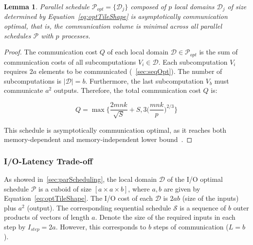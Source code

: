 \documentclass[sigplan,review,anonymous,10pt]{acmart}\settopmatter{printfolios=true,printccs=false,printacmref=false}
\newtheorem{lma}{Lemma}
\begin{document}
\begin{lma}
  \label{lma:parSchedule}
  Parallel schedule $\mathcal{P}_{opt} = \{\mathcal{D}_j\}$ composed of $p$ 
  local domains $\mathcal{D}_j$ of size 
  determined by Equation~\ref{eq:optTileShape} is asymptotically 
  communication optimal, that is, the communication volume is minimal across 
  all parallel schedules $\mathcal{P}$ with $p$ processes.
\end{lma}

\begin{proof}
The communication cost $Q$ of each local domain $\mathcal{D} \in 
\mathcal{P}_{opt}$ is the sum of communication costs of all subcomputations 
$V_i 
\in \mathcal{D}$. Each subcomputation $V_i$ requires $2a$ elements to be 
communicated (~\cref{sec:seqOpt}). The number of subcomputations is 
$|\mathcal{D}| = b$. Furthermore, the last subcomputation $V_b$ must 
communicate $a^2$ outputs. Therefore, the total communication cost $Q$ 
is: 
\vspace{-1em}

$$Q = \max\Big\{\frac{2mnk}{\sqrt{S}} + 
S, 3\Big(\frac{mnk}{p}\Big)^{2/3}  \Big\}$$

This schedule is asymptotically communication optimal, as it reaches both 
memory-dependent and 
memory-independent lower bound~\cite{memIndependentBound}.
\end{proof}


\subsubsection{I/O-Latency Trade-off}
\label{sec:latencyTradeoff}
As showed in~\cref{sec:parScheduling}, the local domain $\mathcal{D}$ of the 
I/O optimal 
schedule $\mathcal{P}$ is a cuboid of size $[a \times a \times b]$, where $a, 
b$ are given by Equation~\ref{eq:optTileShape}. The I/O cost of each  
$\mathcal{D}$ is $2ab$ (size of the inputs) plus $a^2$ (output). 
 The corresponding sequential 
schedule $\mathcal{S}$ is a sequence of $b$ outer products of vectors of length 
$a$. Denote the size of the required inputs in each step by $I_{step} = 2a$. 
However, this corresponds to $b$ steps of communication ($L = b$).
\end{document}
